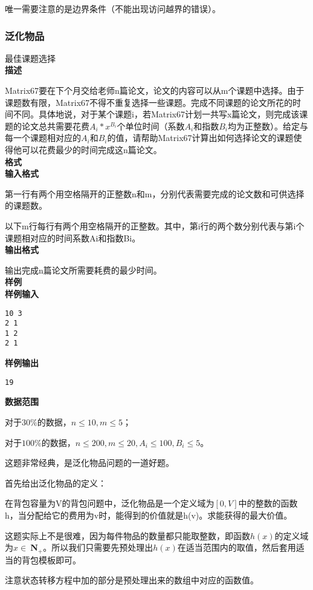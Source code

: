 唯一需要注意的是边界条件（不能出现访问越界的错误）。

\subsubsection{泛化物品}
\begin{example}最佳课题选择\ \\
	\textbf{描述}

	Matrix67要在下个月交给老师n篇论文，论文的内容可以从m个课题中选择。由于课题数有限，Matrix67不得不重复选择一些课题。完成不同课题的论文所花的时间不同。具体地说，对于某个课题i，若Matrix67计划一共写x篇论文，则完成该课题的论文总共需要花费$A_i*x^{B_i}$个单位时间（系数$A_i$和指数$B_i$均为正整数）。给定与每一个课题相对应的$A_i$和$B_i$的值，请帮助Matrix67计算出如何选择论文的课题使得他可以花费最少的时间完成这n篇论文。\ \\
	\textbf{格式}\\
	\textbf{输入格式}

	第一行有两个用空格隔开的正整数n和m，分别代表需要完成的论文数和可供选择的课题数。

	以下m行每行有两个用空格隔开的正整数。其中，第i行的两个数分别代表与第i个课题相对应的时间系数Ai和指数Bi。\\
	\textbf{输出格式}

	输出完成n篇论文所需要耗费的最少时间。
	\ \\
	\textbf{样例}\\
	\textbf{样例输入}
	\begin{verbatim}
10 3
2 1
1 2
2 1
\end{verbatim}
	\textbf{样例输出}
	\begin{verbatim}
19
\end{verbatim}
	\textbf{数据范围}

	对于$30\%$的数据，$n\leq10, m\leq5$；

	对于$100\%$的数据，$n\leq200, m\leq20, A_i\leq100, B_i\leq5$。
\end{example}

这题非常经典，是泛化物品问题的一道好题。

首先给出泛化物品的定义：
\begin{definition}[泛化物品]在背包容量为V的背包问题中，泛化物品是一个定义域为$[0,V]$中的整数的函数h，当分配给它的费用为v时，能得到的价值就是h(v)。求能获得的最大价值。
\end{definition}

这题实际上不是很难，因为每件物品的数量都只能取整数，即函数$h(x)$的定义域为$x \in\ $\textbf{N}$_+$。所以我们只需要先预处理出$h(x)$在适当范围内的取值，然后套用适当的背包模板即可。

注意状态转移方程中加的部分是预处理出来的数组中对应的函数值。

\note